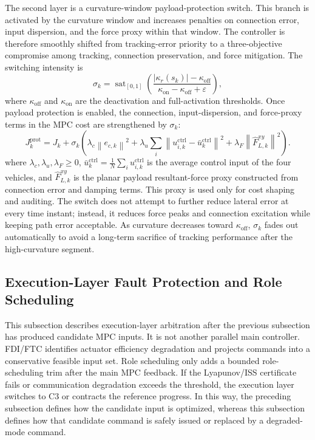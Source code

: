 \documentclass[twocolumn,3p,times,procedia]{elsarticle}
\newcommand{\norm}[1]{\left\lVert #1 \right\rVert}
\begin{document}
The second layer is a curvature-window payload-protection switch. This branch is activated by the curvature window and increases penalties on connection error, input dispersion, and the force proxy within that window. The controller is therefore smoothly shifted from tracking-error priority to a three-objective compromise among tracking, connection preservation, and force mitigation. The switching intensity is
\begin{equation}
\sigma_k=\operatorname{sat}_{[0,1]}\!\left(
\frac{|\kappa_r(s_k)|-\kappa_{\mathrm{off}}}
{\kappa_{\mathrm{on}}-\kappa_{\mathrm{off}}+\varepsilon}
\right),
\label{eq:payload_protection_switch}
\end{equation}
where $\kappa_{\mathrm{off}}$ and $\kappa_{\mathrm{on}}$ are the deactivation and full-activation thresholds. Once payload protection is enabled, the connection, input-dispersion, and force-proxy terms in the MPC cost are strengthened by $\sigma_k$:
\begin{equation}
J_k^{\mathrm{prot}}=J_k+
\sigma_k\!\left(
\lambda_c\norm{e_{c,k}}^2+
\lambda_u\sum_i\norm{u_{i,k}^{\mathrm{ctrl}}-\bar u_k^{\mathrm{ctrl}}}^2+
\lambda_F\norm{\hat F_{L,k}^{xy}}^2
\right).
\label{eq:payload_protection_cost}
\end{equation}
where $\lambda_c,\lambda_u,\lambda_F\ge0$, $\bar u_k^{\mathrm{ctrl}}=\frac{1}{N}\sum_i u_{i,k}^{\mathrm{ctrl}}$ is the average control input of the four vehicles, and $\hat F_{L,k}^{xy}$ is the planar payload resultant-force proxy constructed from connection error and damping terms. This proxy is used only for cost shaping and auditing. The switch does not attempt to further reduce lateral error at every time instant; instead, it reduces force peaks and connection excitation while keeping path error acceptable. As curvature decreases toward $\kappa_{\mathrm{off}}$, $\sigma_k$ fades out automatically to avoid a long-term sacrifice of tracking performance after the high-curvature segment.

\subsection{Execution-Layer Fault Protection and Role Scheduling}

This subsection describes execution-layer arbitration after the previous subsection has produced candidate MPC inputs. It is not another parallel main controller. FDI/FTC identifies actuator efficiency degradation and projects commands into a conservative feasible input set. Role scheduling only adds a bounded role-scheduling trim after the main MPC feedback. If the Lyapunov/ISS certificate fails or communication degradation exceeds the threshold, the execution layer switches to C3 or contracts the reference progress. In this way, the preceding subsection defines how the candidate input is optimized, whereas this subsection defines how that candidate command is safely issued or replaced by a degraded-mode command.
\end{document}
